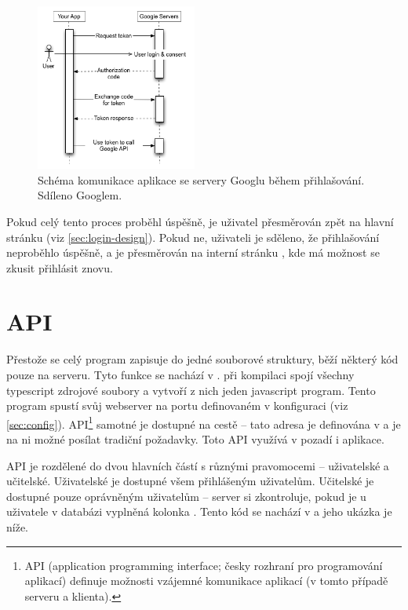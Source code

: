 \begin{figure}[H]
    \centering
    \includegraphics[width=200px]{images/02technologie/google-auth.png}
    \caption{Schéma komunikace aplikace se servery Googlu během přihlašování. Sdíleno Googlem. \cite{google-auth}}
\end{figure}

Pokud celý tento proces proběhl úspěšně, je uživatel přesměrován zpět na hlavní stránku (viz \ref{sec:login-design}). Pokud ne, uživateli je sděleno, že přihlašování neproběhlo úspěšně, a je přesměrován na interní stránku , kde má možnost se zkusit přihlásit znovu.

\section{API}
\label{api}

Přestože se celý program zapisuje do jedné souborové struktury, běží některý kód pouze na serveru. Tyto funkce se nachází v .  při kompilaci spojí všechny typescript zdrojové soubory a vytvoří z nich jeden javascript program. Tento program spustí svůj webserver na portu definovaném v konfiguraci (viz \ref{sec:config}). API\footnote{API (application programming interface; česky rozhraní pro programování aplikací) definuje možnosti vzájemné komunikace aplikací (v tomto případě serveru a klienta).} samotné je dostupné na cestě  -- tato adresa je definována v  a je na ni možné posílat tradiční  požadavky. Toto API využívá v pozadí i aplikace.

API je rozdělené do dvou hlavních částí s různými pravomocemi -- uživatelské a učitelské. Uživatelské je dostupné všem přihlášeným uživatelům. Učitelské je dostupné pouze oprávněným uživatelům -- server si zkontroluje, pokud je u uživatele v databázi vyplněná kolonka . Tento kód se nachází v  a jeho ukázka je níže.

